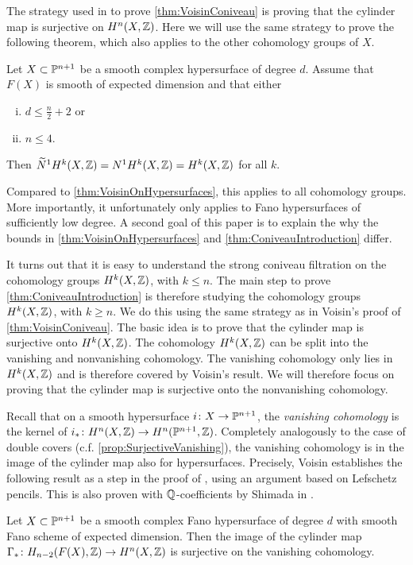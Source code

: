 The strategy used in \cite{VoisinConiveauThreefolds} to prove \cref{thm:VoisinConiveau} is proving that the cylinder map is surjective on $H^n(X,\Z)$. Here we will use the same strategy to prove the following theorem, which also applies to the other cohomology groups of $X$.
\begin{theorem}
\label{thm:ConiveauIntroduction}
  Let $X \subset \P^{n+1}$ be a smooth complex hypersurface of degree $d$. Assume that $F(X)$ is smooth of expected dimension and that either
  \begin{enumerate}[i)]
    \item$d \leq \frac{n}{2}+2$ or 
    \item $n \leq 4$.
  \end{enumerate}
Then $\widetilde{N}^1H^k(X,\Z) = N^1H^k(X,\Z) = H^k(X,\Z)$ for all $k$.
\end{theorem}
Compared to \cref{thm:VoisinOnHypersurfaces}, this applies to all cohomology groups. More importantly, it unfortunately only applies to Fano hypersurfaces of sufficiently low degree. A second goal of this paper is to explain the why the bounds in \cref{thm:VoisinOnHypersurfaces} and \cref{thm:ConiveauIntroduction} differ.

It turns out that it is easy to understand the strong coniveau filtration on the cohomology groups $H^k(X,\Z)$, with $k \leq n$. The main step to prove \cref{thm:ConiveauIntroduction} is therefore studying the cohomology groups $H^k(X,\Z)$, with $k \geq n$. We do this using the same strategy as in Voisin's proof of \cref{thm:VoisinConiveau}. The basic idea is to prove that the cylinder map is surjective onto $H^k(X,\Z)$. The cohomology $H^k(X,\Z)$ can be split into the vanishing and nonvanishing cohomology. The vanishing cohomology only lies in $H^k(X,\Z)$ and is therefore covered by Voisin's result. We will therefore focus on proving that the cylinder map is surjective onto the nonvanishing cohomology.

Recall that on a smooth hypersurface $i \from X \to \P^{n+1}$, the \emph{vanishing cohomology} is the kernel of $i_* \from H^n(X,\Z) \to H^n(\P^{n+1},\Z)$. Completely analogously to the case of double covers (c.f. \cref{prop:SurjectiveVanishing}), the vanishing cohomology is in the image of the cylinder map also for hypersurfaces. Precisely, Voisin establishes the following result as a step in the proof of \cite[Theorem 1.13]{VoisinConiveauThreefolds}, using an argument based on Lefschetz pencils. This is also proven with $\Q$-coefficients by Shimada in \cite[Proposition 4]{ShimadaHypersurfaces}.
\begin{proposition}
\label{prop:SurjectiveVanishingHypersurface}
	Let $X \subset \P^{n+1}$ be a smooth complex Fano hypersurface of degree $d$ with smooth Fano scheme of expected dimension. Then the image of the cylinder map $\Gamma_* \from H_{n-2}(F(X),\Z) \to H^n(X,\Z)$ is surjective on the vanishing cohomology.
\end{proposition}

